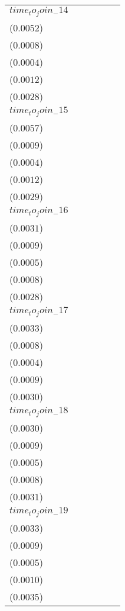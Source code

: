 \begin{tabular}{llllll}
$time_to_join_-14$ &   \makecell{$0.0029^{}$ \\ ($0.0052$)} &  \makecell{$-0.0004^{}$ \\ ($0.0008$)} &  \makecell{$-0.0001^{}$ \\ ($0.0004$)} &   \makecell{$0.0010^{}$ \\ ($0.0012$)} &   \makecell{$0.0030^{}$ \\ ($0.0028$)} \\
$time_to_join_-15$ &   \makecell{$0.0053^{}$ \\ ($0.0057$)} &  \makecell{$-0.0003^{}$ \\ ($0.0009$)} &   \makecell{$0.0000^{}$ \\ ($0.0004$)} &   \makecell{$0.0015^{}$ \\ ($0.0012$)} &   \makecell{$0.0031^{}$ \\ ($0.0029$)} \\
$time_to_join_-16$ &  \makecell{$-0.0015^{}$ \\ ($0.0031$)} &  \makecell{$-0.0006^{}$ \\ ($0.0009$)} &  \makecell{$-0.0003^{}$ \\ ($0.0005$)} &  \makecell{$-0.0004^{}$ \\ ($0.0008$)} &   \makecell{$0.0029^{}$ \\ ($0.0028$)} \\
$time_to_join_-17$ &  \makecell{$-0.0033^{}$ \\ ($0.0033$)} &  \makecell{$-0.0006^{}$ \\ ($0.0008$)} &  \makecell{$-0.0003^{}$ \\ ($0.0004$)} &  \makecell{$-0.0006^{}$ \\ ($0.0009$)} &   \makecell{$0.0027^{}$ \\ ($0.0030$)} \\
$time_to_join_-18$ &  \makecell{$-0.0026^{}$ \\ ($0.0030$)} &  \makecell{$-0.0006^{}$ \\ ($0.0009$)} &  \makecell{$-0.0004^{}$ \\ ($0.0005$)} &  \makecell{$-0.0005^{}$ \\ ($0.0008$)} &   \makecell{$0.0028^{}$ \\ ($0.0031$)} \\
$time_to_join_-19$ &  \makecell{$-0.0024^{}$ \\ ($0.0033$)} &  \makecell{$-0.0006^{}$ \\ ($0.0009$)} &  \makecell{$-0.0003^{}$ \\ ($0.0005$)} &  \makecell{$-0.0003^{}$ \\ ($0.0010$)} &   \makecell{$0.0032^{}$ \\ ($0.0035$)} \\

\end{tabular}

